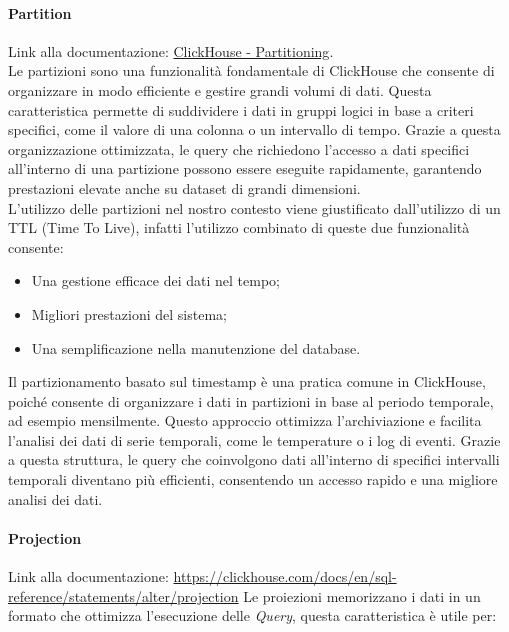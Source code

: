 \paragraph{Partition}\label{sec:Partition}
Link alla documentazione: \href{https://clickhouse.com/docs/en/engines/table-engines/mergetree-family/mergetree#partition-by}{ClickHouse - Partitioning}.\\
Le partizioni sono una funzionalità fondamentale di ClickHouse che consente di organizzare in modo efficiente e gestire grandi volumi di dati. Questa caratteristica permette di suddividere i dati in gruppi logici in base a criteri specifici, come il valore di una colonna o un intervallo di tempo. Grazie a questa organizzazione ottimizzata, le query che richiedono l'accesso a dati specifici all'interno di una partizione possono essere eseguite rapidamente, garantendo prestazioni elevate anche su dataset di grandi dimensioni.\\
L'utilizzo delle partizioni nel nostro contesto viene giustificato dall'utilizzo di un TTL (Time To Live), infatti l'utilizzo combinato di queste due funzionalità consente:
\begin{itemize}
    \item Una gestione efficace dei dati nel tempo;
    \item Migliori prestazioni del sistema;
    \item Una semplificazione nella manutenzione del database.
\end{itemize}
Il partizionamento basato sul timestamp è una pratica comune in ClickHouse, poiché consente di organizzare i dati in partizioni in base al periodo temporale, ad esempio mensilmente. Questo approccio ottimizza l'archiviazione e facilita l'analisi dei dati di serie temporali, come le temperature o i log di eventi. Grazie a questa struttura, le query che coinvolgono dati all'interno di specifici intervalli temporali diventano più efficienti, consentendo un accesso rapido e una migliore analisi dei dati.




    
\paragraph{Projection}\label{sec:projections}
Link alla documentazione: \href{https://clickhouse.com/docs/en/sql-reference/statements/alter/projection}{https://clickhouse.com/docs/en/sql-reference/statements/alter/projection}\newline
Le proiezioni memorizzano i dati in un formato che ottimizza l'esecuzione delle \textit{Query}, questa caratteristica è utile per:

